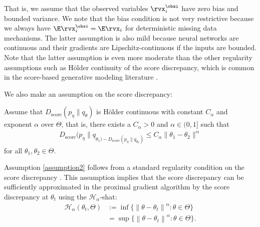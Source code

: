 \documentclass{article} %
\begin{document}
That is, we assume that the observed variables $\rvx_{i}^{\obsi}$ have zero bias and bounded variance.
We note that the bias condition is not very restrictive because we always have $\E \rvx_{i}^{\obsi}=\E \rvx_{i}$ for deterministic missing data mechanisms. The latter assumption is also mild because neural networks are continuous and their gradients are Lipschitz-continuous if the inputs are bounded. Note that the latter assumption is even more moderate than the other regularity assumptions such as H\"older continuity of the score discrepancy, which is common in the score-based generative modeling literature \citep{Song2019}.

We also make an assumption on the score discrepancy:
\begin{assumption}%
	\label{assumption2}
	Assume that $D_{\text{score}}(p_{\eta} \| q_{\theta})$ is H\"older continuous with constant $C_{\alpha}$ and exponent $\alpha$ over $\Theta$, that is, there exists a $C_{\alpha} > 0$ and $\alpha \in (0, 1]$ such that
	\begin{align*}
		D_{\text{score}}(p_{\eta} \| q_{\theta_{1}) - D_{\text{score}}(p_{\eta} \| q_{\theta_{2}})} \leq C_{\alpha} \| \theta_{1} - \theta_{2} \|^{\alpha}
	\end{align*}
	for all $\theta_{1}, \theta_{2} \in \Theta$.
\end{assumption}
Assumption \ref{assumption2} follows from a standard regularity condition on the score discrepancy \citep{Song2019}. This assumption implies that the score discrepancy can be sufficiently approximated in the proximal gradient algorithm by the score discrepancy at $\theta_{t}$ using the $\mathcal{H}_{\alpha}$-shat:
\begin{align*}
	\mathcal{H}_{\alpha}(\theta_{t}, \Theta) &:= \inf \{ \left\| \theta - \theta_{t} \right\|^{\alpha} : \theta \in \Theta \} \\ 
	&= \sup \{ \left\| \theta - \theta_{t} \right\|^{\alpha} : \theta \in \Theta \}.
\end{align*}
\end{document}
